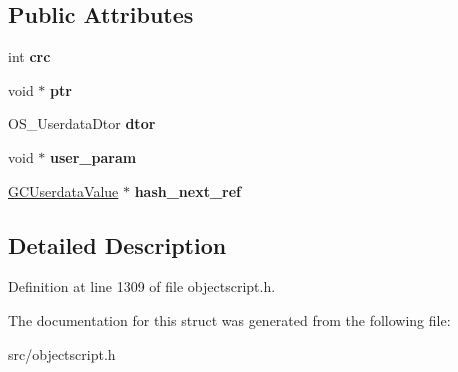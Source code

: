 \subsection*{Public Attributes}
\begin{DoxyCompactItemize}
\item 
int {\bfseries crc}\hypertarget{struct_object_script_1_1_o_s_1_1_core_1_1_g_c_userdata_value_acd5b859967daa759fadf1758ec906a5c}{}\label{struct_object_script_1_1_o_s_1_1_core_1_1_g_c_userdata_value_acd5b859967daa759fadf1758ec906a5c}

\item 
void $\ast$ {\bfseries ptr}\hypertarget{struct_object_script_1_1_o_s_1_1_core_1_1_g_c_userdata_value_a4de0cd86b3dfc7eec5e60f341f0f14c4}{}\label{struct_object_script_1_1_o_s_1_1_core_1_1_g_c_userdata_value_a4de0cd86b3dfc7eec5e60f341f0f14c4}

\item 
O\+S\+\_\+\+Userdata\+Dtor {\bfseries dtor}\hypertarget{struct_object_script_1_1_o_s_1_1_core_1_1_g_c_userdata_value_a6cd97191e882f0331649b095974af3cb}{}\label{struct_object_script_1_1_o_s_1_1_core_1_1_g_c_userdata_value_a6cd97191e882f0331649b095974af3cb}

\item 
void $\ast$ {\bfseries user\+\_\+param}\hypertarget{struct_object_script_1_1_o_s_1_1_core_1_1_g_c_userdata_value_a54e4e110a3f5d40b4fe9cb89de010a7a}{}\label{struct_object_script_1_1_o_s_1_1_core_1_1_g_c_userdata_value_a54e4e110a3f5d40b4fe9cb89de010a7a}

\item 
\hyperlink{struct_object_script_1_1_o_s_1_1_core_1_1_g_c_userdata_value}{G\+C\+Userdata\+Value} $\ast$ {\bfseries hash\+\_\+next\+\_\+ref}\hypertarget{struct_object_script_1_1_o_s_1_1_core_1_1_g_c_userdata_value_a40ac43516b6ddbe0f8ec978633471d6b}{}\label{struct_object_script_1_1_o_s_1_1_core_1_1_g_c_userdata_value_a40ac43516b6ddbe0f8ec978633471d6b}

\end{DoxyCompactItemize}


\subsection{Detailed Description}


Definition at line 1309 of file objectscript.\+h.



The documentation for this struct was generated from the following file\+:\begin{DoxyCompactItemize}
\item 
src/objectscript.\+h\end{DoxyCompactItemize}
